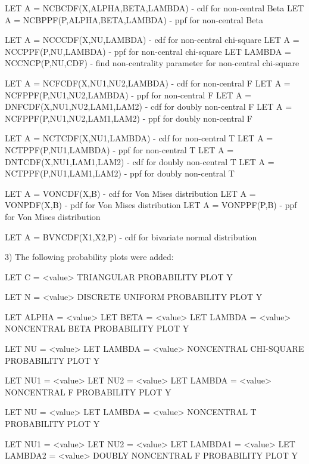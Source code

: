 {       LET A = NCBCDF(X,ALPHA,BETA,LAMBDA) - cdf for non-central Beta
       LET A = NCBPPF(P,ALPHA,BETA,LAMBDA) - ppf for non-central Beta

       LET A = NCCCDF(X,NU,LAMBDA)         - cdf for non-central
                                             chi-square
       LET A = NCCPPF(P,NU,LAMBDA)         - ppf for non-central 
                                             chi-square
       LET LAMBDA = NCCNCP(P,NU,CDF)       - find non-centrality 
                                             parameter for non-central
                                             chi-square

       LET A = NCFCDF(X,NU1,NU2,LAMBDA)    - cdf for non-central F
       LET A = NCFPPF(P,NU1,NU2,LAMBDA)    - ppf for non-central F
       LET A = DNFCDF(X,NU1,NU2,LAM1,LAM2) - cdf for doubly non-central F
       LET A = NCFPPF(P,NU1,NU2,LAM1,LAM2) - ppf for doubly non-central F

       LET A = NCTCDF(X,NU1,LAMBDA)        - cdf for non-central T
       LET A = NCTPPF(P,NU1,LAMBDA)        - ppf for non-central T
       LET A = DNTCDF(X,NU1,LAM1,LAM2)     - cdf for doubly non-central T
       LET A = NCTPPF(P,NU1,LAM1,LAM2)     - ppf for doubly non-central T

       LET A = VONCDF(X,B)     - cdf for Von Mises distribution
       LET A = VONPDF(X,B)     - pdf for Von Mises distribution
       LET A = VONPPF(P,B)     - ppf for Von Mises distribution

       LET A = BVNCDF(X1,X2,P) - cdf for bivariate normal distribution

 3) The following probability plots were added:

       LET C = <value>
       TRIANGULAR PROBABILITY PLOT Y

       LET N = <value>
       DISCRETE UNIFORM PROBABILITY PLOT Y

       LET ALPHA = <value>
       LET BETA = <value>
       LET LAMBDA = <value>
       NONCENTRAL BETA PROBABILITY PLOT Y

       LET NU = <value>
       LET LAMBDA = <value>
       NONCENTRAL CHI-SQUARE PROBABILITY PLOT Y

       LET NU1 = <value>
       LET NU2 = <value>
       LET LAMBDA = <value>
       NONCENTRAL F PROBABILITY PLOT Y

       LET NU = <value>
       LET LAMBDA = <value>
       NONCENTRAL T PROBABILITY PLOT Y

       LET NU1 = <value>
       LET NU2 = <value>
       LET LAMBDA1 = <value>
       LET LAMBDA2 = <value>
       DOUBLY NONCENTRAL F PROBABILITY PLOT Y

}
